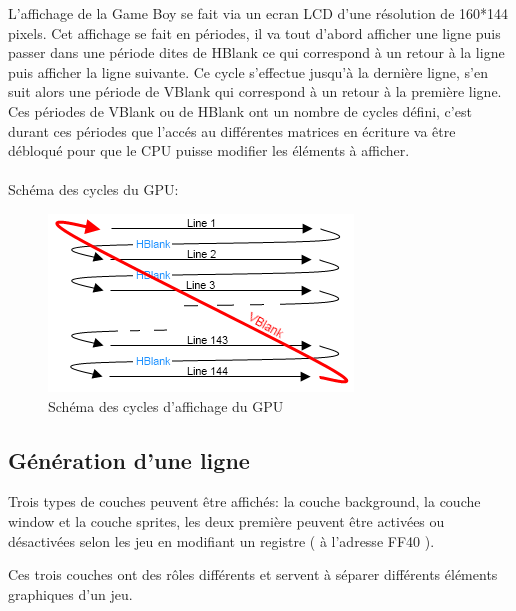\documentclass{report}
\begin{document}
L'affichage de la Game Boy se fait via un ecran LCD d'une résolution de 160*144 pixels. Cet affichage se fait en périodes, il va tout d'abord afficher une ligne puis passer dans une période dites de HBlank ce qui correspond à un retour à la ligne puis afficher la ligne suivante. Ce cycle s'effectue jusqu'à la dernière ligne, s'en suit alors une période de VBlank qui correspond à un retour à la première ligne.
Ces périodes de VBlank ou de HBlank ont un nombre de cycles défini, c'est
durant ces périodes que l'accés au différentes matrices en écriture va être
débloqué pour que le CPU puisse modifier les éléments à afficher.\\\\

Schéma des cycles du GPU:\\
\begin{figure}[!h]
\centering
\includegraphics[scale=0.8]{images/gpu_cycles.png}
\caption{Schéma des cycles d'affichage du GPU}
\label{gpucycles}
\end{figure}


\subsection{Génération d'une ligne}

Trois types de couches peuvent être affichés: la couche background, la couche
window et la couche sprites, les deux première peuvent être activées ou
désactivées selon les jeu en modifiant un registre ( à l'adresse FF40 ).

Ces trois couches ont des rôles différents et servent à séparer différents
éléments graphiques d'un jeu.\\
\end{document}
